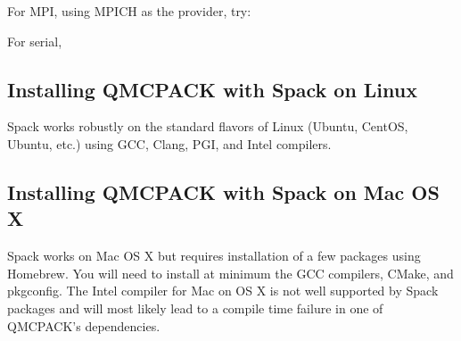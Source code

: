 \documentclass[letterpaper,10pt,english]{sphinxmanual}
\begin{document}
For MPI, using MPICH as the provider, try:

\begin{sphinxVerbatim}[commandchars=\\\{\}]
          
\end{sphinxVerbatim}

For serial,

\begin{sphinxVerbatim}[commandchars=\\\{\}]
       
\end{sphinxVerbatim}


\subsection{Installing QMCPACK with Spack on Linux}
\label{\detokenize{installation:installing-qmcpack-with-spack-on-linux}}
Spack works robustly on the standard flavors of Linux (Ubuntu, CentOS,
Ubuntu, etc.) using GCC, Clang, PGI, and Intel compilers.


\subsection{Installing QMCPACK with Spack on Mac OS X}
\label{\detokenize{installation:installing-qmcpack-with-spack-on-mac-os-x}}
Spack works on Mac OS X but requires installation of a few packages
using Homebrew. You will need to install at minimum the GCC compilers,
CMake, and pkg\sphinxhyphen{}config. The Intel compiler for Mac on OS X is not well
supported by Spack packages and will most likely lead to a compile
time failure in one of QMCPACK’s dependencies.
\end{document}
